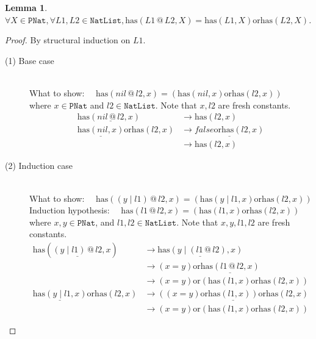 \documentclass[12pt, a4paper]{article}
\newtheorem{lemma}[theorem]{Lemma}
\newcommand{\rel}[1]{\mathrel{#1}}
\newcommand{\rmx}[1]{\mathrm{#1}}
\newcommand{\larrow}{\longrightarrow}
\newcommand{\under}{\underline}
\begin{document}
\begin{lemma}
\label{lm1}
$\forall X \in \mathtt{PNat}, \forall L1, L2 \in \mathtt{NatList}, \rmx{has}(L1 \rel{@} L2, X) = \rmx{has}(L1, X) \rel{\rmx{or}} \rmx{has}(L2, X)$.
\end{lemma}
\begin{proof}
By structural induction on $L1$.

\begin{description}

\item[(1) Base case]~\\
\noindent
What to show: $\quad \rmx{has}(nil \rel{@} l2, x) = (\rmx{has}(nil, x) \rel{\rmx{or}} \rmx{has}(l2, x))$ \\
where $x \in \mathtt{PNat}$ and $l2 \in \mathtt{NatList}$. Note that $x, l2$ are fresh constants.
\begin{align*}
\rmx{has}(\under{nil \rel{@} l2}, x)
	&\larrow \rmx{has}(l2, x) \tag{by @1} \\
\under{\rmx{has}(nil, x)} \rel{\rmx{or}} \rmx{has}(l2, x)
	&\larrow \under{false \rel{\rmx{or}} \rmx{has}(l2, x)} \tag{by has1} \\
	&\larrow \rmx{has}(l2, x) \tag{by or}
\end{align*}

\item[(2) Induction case]~\\
What to show: $\quad \rmx{has}((y \rel{|} l1) \rel{@} l2, x) = (\rmx{has}(y \rel{|} l1, x) \rel{\rmx{or}} \rmx{has}(l2, x))$ \\
Induction hypothesis: $\quad \rmx{has}(l1 \rel{@} l2, x) = (\rmx{has}(l1, x) \rel{\rmx{or}} \rmx{has}(l2, x))$  \\
where $x, y \in \mathtt{PNat}$, and $l1, l2 \in \mathtt{NatList}$. Note that $x, y, l1, l2$ are fresh constants.
\begin{align*}
\rmx{has}(\under{(y \rel{|} l1) \rel{@} l2}, x)
	&\larrow \under{\rmx{has}(y \rel{|} (l1 \rel{@} l2), x)} \tag{by @2} \\
	&\larrow (x = y) \rel{\rmx{or}} \under{\rmx{has}(l1 \rel{@} l2, x)} \tag{by has2} \\
	&\larrow (x = y) \rel{\rmx{or}} (\rmx{has}(l1, x) \rel{\rmx{or}} \rmx{has}(l2, x)) \tag{by IH} \\
\under{\rmx{has}(y \rel{|} l1, x)} \rel{\rmx{or}} \rmx{has}(l2, x)
	&\larrow \under{((x = y) \rel{\rmx{or}} \rmx{has}(l1, x)) \rel{\rmx{or}} \rmx{has}(l2, x)} \tag{by has2} \\
	&\larrow (x = y) \rel{\rmx{or}} (\rmx{has}(l1, x) \rel{\rmx{or}} \rmx{has}(l2, x)) \tag{by assoc-or}
\end{align*}

\end{description}
\end{proof}
\end{document}
